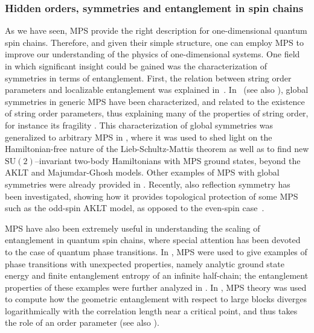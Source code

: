 \documentclass{article}
\theoremstyle{plain}
\theoremstyle{definition}
\numberwithin{equation}{section}  %
\begin{document}
\subsubsection{Hidden orders, symmetries and entanglement in spin chains}

As we have seen, MPS provide the right description for one-dimensional
quantum spin chains. Therefore, and given their simple structure, one can
employ MPS to improve our understanding of the physics of one-dimensional
systems.  One field in which significant insight could be gained was the
characterization of symmetries in terms of entanglement.  First, the
relation between string order parameters and localizable entanglement was
explained in~\cite{verstraete:div-ent-length,venuti:locent-stringorder}.
In~\cite{david:stringorder-1d} (see also \cite{singh:mps-decomp-sym}),
global symmetries in generic MPS have been characterized, and related to
the
existence of string order parameters, thus explaining many of the
properties of string order, for instance its fragility
\cite{anfuso:stringorder-frag}. This characterization of global symmetries
was generalized to arbitrary MPS in \cite{sanz:mps-syms}, where it was used to
shed light on the Hamiltonian-free nature of the Lieb-Schultz-Mattis
theorem as well as to find new $\mathrm{SU(2)}$--invariant two-body
Hamiltonians with MPS ground states, beyond the AKLT and Majumdar-Ghosh
models.  Other examples of MPS with global symmetries were already
provided in \cite{fannes:FCS,karimipour:aklt-syms,tu:SOn-mps-gs}.
Recently, also reflection symmetry has been investigated, showing how it
provides topological protection of some MPS such as the odd-spin
AKLT model, as opposed to the even-spin case~\cite{pollmann:symprot-1d}.

MPS have also been extremely useful in understanding the scaling of
entanglement in quantum spin chains, where special attention has been devoted
to the case of quantum phase transitions. In \cite{wolf:mps-qpt}, MPS were used
to give examples of phase transitions with unexpected properties, namely
analytic ground state energy and finite entanglement entropy of an
infinite half-chain; the entanglement properties of these examples were
further analyzed in \cite{cozzini:mps-qpt-fidelity,wei:mps-qpt}. In
\cite{orus:mps-qpt-geoent},
MPS theory was used to compute how the geometric entanglement with respect
to large blocks diverges logarithmically with the correlation length near
a critical point, and thus takes the role of an order parameter (see also
\cite{wei:mps-qpt}).
\end{document}
